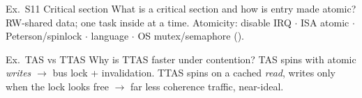 \begin{example2}{Ex.\ S11 Critical section}
    What is a critical section and how is entry made atomic?
    \tcblower
    RW-shared data; one task inside at a time. Atomicity: disable IRQ $\cdot$ ISA atomic $\cdot$ Peterson/spinlock $\cdot$ language $\cdot$ OS mutex/semaphore ().
\end{example2}

\begin{example2}{Ex.\ TAS vs TTAS}
    Why is TTAS faster under contention?
    \tcblower
    TAS spins with atomic \emph{writes} $\to$ bus lock + invalidation. TTAS spins on a cached \emph{read}, writes only when the lock looks free $\to$ far less coherence traffic, near-ideal.
\end{example2}
